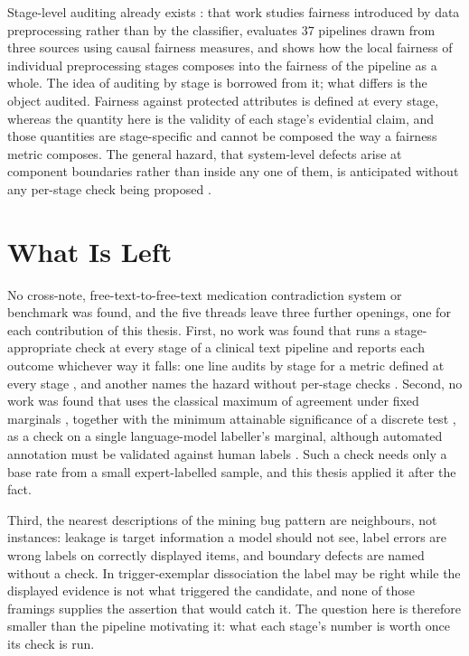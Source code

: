 Stage-level auditing already exists \citep{biswas2021fairpreprocessing}: that work
studies fairness introduced by data preprocessing rather than by the classifier,
evaluates 37 pipelines drawn from three sources using causal fairness measures,
and shows how the local fairness of individual preprocessing stages composes into
the fairness of the pipeline as a whole. The idea of auditing by stage is borrowed
from it; what differs is the object audited. Fairness against protected attributes
is defined at every stage, whereas the quantity here is the validity of each
stage's evidential claim, and those quantities are stage-specific and cannot be
composed the way a fairness metric composes. The general hazard, that
system-level defects arise at component boundaries rather than inside any one of
them, is anticipated without any per-stage check being proposed
\citep{sculley2015debt}.

\section{What Is Left}
\label{sec:lit-gap}

No cross-note, free-text-to-free-text medication contradiction system or benchmark was found, and the
five threads leave three further openings, one for each contribution of this thesis. First, no work
was found that runs a stage-appropriate check at every stage of a clinical text pipeline and reports
each outcome whichever way it falls: one line audits by stage for a metric
defined at every stage \citep{biswas2021fairpreprocessing}, and another names the hazard without
per-stage checks \citep{sculley2015debt}. Second, no work was found that uses the
classical maximum of agreement under fixed marginals \citep{cohen1960kappa},
together with the minimum attainable significance of a discrete test
\citep{tarone1990modified}, as a check on a single language-model labeller's
marginal, although automated annotation must be validated against human labels
\citep{pangakis2023validation,egami2023surrogates}. Such a check needs only a base
rate from a small expert-labelled sample, and this thesis applied it after the fact.

Third, the nearest descriptions of the mining bug pattern are neighbours, not instances: leakage
\citep{kaufman2012leakage} is target information a model should not see, label errors
\citep{northcutt2021labelerrors} are wrong labels on correctly displayed items, and boundary defects
\citep{sculley2015debt} are named without a check. In trigger-exemplar dissociation the label may be
right while the displayed evidence is not what triggered the candidate, and none of those framings
supplies the assertion that would catch it. The question here is therefore smaller than the pipeline
motivating it: what each stage's number is worth once its check is run.
